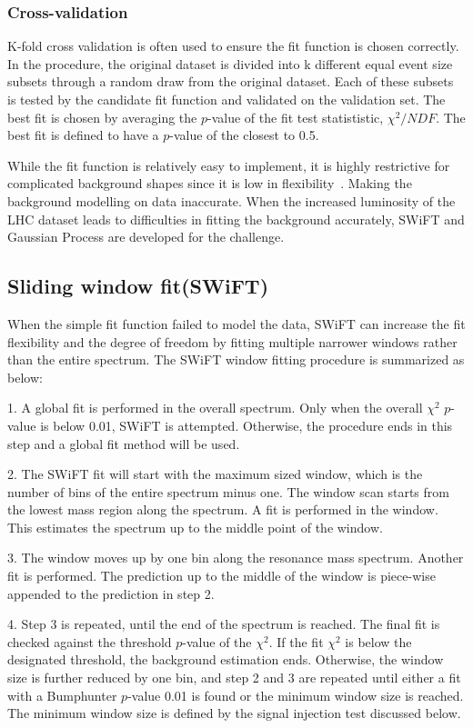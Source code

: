 \subsubsection{Cross-validation}
K-fold cross validation is often used to ensure the fit function is chosen correctly. In the procedure, the original dataset is divided into k different equal event size subsets through a random draw from the original dataset. Each of these subsets is tested by the candidate fit function and validated on the validation set. The best fit is chosen by averaging the $p$-value of the fit test statististic, $\chi^{2}/NDF$. The best fit is defined to have a $p$-value of the closest to 0.5.

While the fit function is relatively easy to implement, it is highly restrictive for complicated background shapes since it is low in flexibility~\cite{ATL-PHYS-PUB-2020-028}. Making the background modelling on data inaccurate. When the increased luminosity of the LHC dataset leads to difficulties in fitting the background accurately, SWiFT and Gaussian Process are developed for the challenge. 

    \subsection{Sliding window fit(SWiFT)}
    When the simple fit function failed to model the data, SWiFT can increase the fit flexibility and the degree of freedom by fitting multiple narrower windows rather than the entire spectrum. The SWiFT window fitting procedure is summarized as below:
    
    1. A global fit is performed in the overall spectrum. Only when the overall $\chi^{2}$ $p$-value is below 0.01, SWiFT is attempted. Otherwise, the procedure ends in this step and a global fit method will be used. 

    2. The SWiFT fit will start with the maximum sized window, which is the number of bins of the entire spectrum minus one. The window scan starts from the lowest mass region along the spectrum. A fit is performed in the window. This estimates the spectrum up to the middle point of the window.

    3. The window moves up by one bin along the resonance mass spectrum. Another fit is performed. The prediction up to the middle of the window is piece-wise appended to the prediction in step 2. 

    4. Step 3 is repeated, until the end of the spectrum is reached. The final fit is checked against the threshold $p$-value of the $\chi^{2}$. If the fit $\chi^{2}$ is below the designated threshold, the background estimation ends. Otherwise, the window size is further reduced by one bin, and step 2 and 3 are repeated until either a fit with a Bumphunter $p$-value 0.01 is found or the minimum window size is reached. The minimum window size is defined by the signal injection test discussed below.

